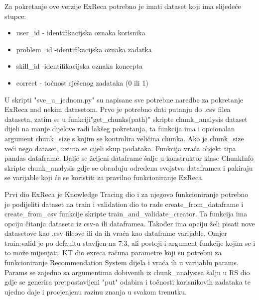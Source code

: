 Za pokretanje ove verzije ExReca potrebno je imati dataset koji ima slijedeće stupce:

\begin{itemize}
	 \item user\_id - identifikacijska oznaka korisnika
	 \item problem\_id -identifikacijska oznaka zadatka
	 \item skill\_id -identifikacijska oznaka koncepta
	 \item correct - točnost rješenog zadataka (0 ili 1)
\end{itemize}

U skripti "sve\_u\_jednom.py" su napisane sve potrebne naredbe za pokretanje ExReca nad nekim datasetom.
Prvo je potrebno dati putanju do .csv filea dataseta, zatim se u funkciji"get\_chunks(path)" skripte chunk\_analysis
dataset dijeli na manje dijelove radi lakšeg pokretanja, ta funkcija ima i opcionalan argument chunk\_size s
kojim se kontrolira veličina chunka. Ako je chunk\_size veći nego dataset, uzima se cijeli skup podataka. Funkcija
vraća objekt tipa pandas dataframe. Dalje se željeni dataframe šalje u konstruktor klase ChunkInfo skripte chunk\_analysis
gdje se obrađuju određena svojstva dataframea i pakiraju se varijable koji će se koristiti za pravilno funkcioniranje ExReca.

Prvi dio ExReca je Knowledge Tracing dio i za njegovo funkcioniranje potrebno je podijeliti dataset na train i validation dio
to rade create\_from\_dataframe i create\_from\_csv funkcije skripte train\_and\_validate\_creator. Ta funkcija ima opciju
čitanja dataseta iz csv-a ili dataframea. Također ima opciju želi pisati nove datasetove kao .csv fileove ili da ih vraća
kao dataframe varijable. Omjer train:valid je po defaultu stavljen na 7:3, ali postoji i argument funkcije kojim se i to može mijenjati.
KT dio exreca računa parametre koji su potrebni za funkcioniranje Recommendation System dijela i vraća ih u varijablu params.
Params se zajedno sa argumentima dobivenih iz chunk\_analysisa šalju u RS dio gdje se generira pretpostavljeni "put" odabira i
točnosti korisnikovih zadataka te ujedno daje i procjenjenu razinu znanja u svakom trenutku.



